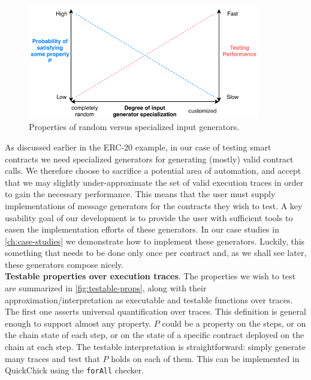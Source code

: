 \documentclass[twoside,11pt,openright]{report}
\newcommand{\coq}[1]{\texttt{#1}}
\begin{document}
\begin{figure}[h]
\begin{center}
\includegraphics[width=0.9\textwidth]{media/random-vs-specialized-generators.pdf}
\end{center}
\caption[A diagram showing the benefits downsides when either specializing a generator, or generalizing it.]{Properties of random versus specialized input generators.}
\label{fig:generators-vs}
\end{figure}
As discussed earlier in the ERC-20 example, in our case of testing smart contracts we need specialized generators for generating (mostly) valid contract calls. We therefore choose to sacrifice a potential area of automation, and accept that we may slightly under-approximate the set of valid execution traces in order to gain the necessary performance. This means that the user must supply implementations of message generators for the contracts they wish to test. A key usability goal of our development is to provide the user with sufficient tools to easen the implementation efforts of these generators. In our case studies in \autoref{ch:case-studies} we demonstrate how to implement these generators. Luckily, this something that needs to be done only once per contract and, as we shall see later, these generators compose nicely.
\medskip\\
\textbf{Testable properties over execution traces}. The properties we wish to test are summarized in \autoref{fig:testable-props}, along with their approximation/interpretation as executable and testable functions over traces. The first one asserts universal quantification over traces. This definition is general enough to support almost any property. $P$ could be a property on the steps, or on the chain state of each step, or on the state of a specific contract deployed on the chain at each step. The testable interpretation is straightforward: simply generate many traces and test that $P$ holds on each of them. This can be implemented in QuickChick using the \coq{forAll} checker. \medskip\\
\end{document}
